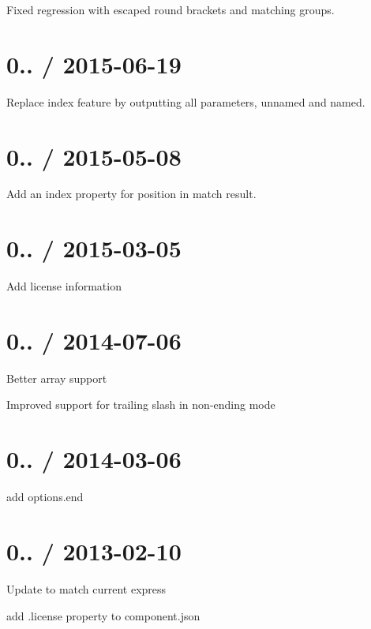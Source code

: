 
\begin{DoxyItemize}
\item Fixed regression with escaped round brackets and matching groups.
\end{DoxyItemize}

\section*{0.. / 2015-\/06-\/19 }


\begin{DoxyItemize}
\item Replace {\ttfamily index} feature by outputting all parameters, unnamed and named.
\end{DoxyItemize}

\section*{0.. / 2015-\/05-\/08 }


\begin{DoxyItemize}
\item Add an index property for position in match result.
\end{DoxyItemize}

\section*{0.. / 2015-\/03-\/05 }


\begin{DoxyItemize}
\item Add license information
\end{DoxyItemize}

\section*{0.. / 2014-\/07-\/06 }


\begin{DoxyItemize}
\item Better array support
\item Improved support for trailing slash in non-\/ending mode
\end{DoxyItemize}

\section*{0.. / 2014-\/03-\/06 }


\begin{DoxyItemize}
\item add options.\+end
\end{DoxyItemize}

\section*{0.. / 2013-\/02-\/10 }


\begin{DoxyItemize}
\item Update to match current express
\item add .license property to component.\+json 
\end{DoxyItemize}